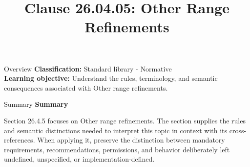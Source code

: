 \documentclass[10pt,letterpaper]{article}
\title{Clause 26.04.05: Other Range Refinements}
\author{}
\date{}
\begin{document}
\maketitle
\begin{CornellOverviewBox}{Overview}
\textbf{Classification:} Standard library - Normative\\[2pt]
\textbf{Learning objective:} Understand the rules, terminology, and semantic consequences associated with Other range refinements.
\end{CornellOverviewBox}\begin{CornellSummaryBox}{Summary}
{\sffamily\bfseries\color{Accent} Summary}\par\vspace{3pt}Section 26.4.5 focuses on Other range refinements. The section supplies the rules and semantic distinctions needed to interpret this topic in context with its cross-references. When applying it, preserve the distinction between mandatory requirements, recommendations, permissions, and behavior deliberately left undefined, unspecified, or implementation-defined.
\end{CornellSummaryBox}
\end{document}
